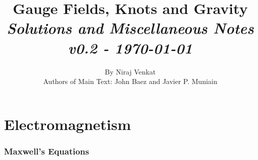 \documentclass[10pt]{article}
\begin{document}
\nocite{*}

\title{{Gauge Fields, Knots and Gravity}\\{\normalsize{\itshape Solutions and Miscellaneous Notes}}\\{\normalsize{\itshape v0.2 - \today}}}
\author{By Niraj Venkat\\Authors of Main Text: John Baez and Javier P. Muniain}
\maketitle
\newpage
\pagestyle{fancynotes}


\part{Electromagnetism}


\section{Maxwell's Equations}\label{b1c1}
\end{document}
